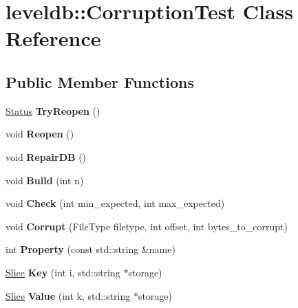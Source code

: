 \hypertarget{classleveldb_1_1_corruption_test}{}\section{leveldb\+::Corruption\+Test Class Reference}
\label{classleveldb_1_1_corruption_test}
\subsection*{Public Member Functions}
\begin{DoxyCompactItemize}
\item 
\mbox{\label{classleveldb_1_1_corruption_test_aaba7c05f06400ef45d1af5cb95f66a57}} 
\mbox{\hyperlink{classleveldb_1_1_status}{Status}} {\bfseries Try\+Reopen} ()
\item 
\mbox{\label{classleveldb_1_1_corruption_test_aa2051faee6b6542d35ebdcf99918a713}} 
void {\bfseries Reopen} ()
\item 
\mbox{\label{classleveldb_1_1_corruption_test_aff36b45496c39a006a14df201ef7d57b}} 
void {\bfseries Repair\+DB} ()
\item 
\mbox{\label{classleveldb_1_1_corruption_test_a54d2114311c61356e879b5ccfc3cda18}} 
void {\bfseries Build} (int n)
\item 
\mbox{\label{classleveldb_1_1_corruption_test_aa03dcde1d0771ebbcf7d6ac8bda9c725}} 
void {\bfseries Check} (int min\+\_\+expected, int max\+\_\+expected)
\item 
\mbox{\label{classleveldb_1_1_corruption_test_a22060ac0a3697640cdcf36973339b646}} 
void {\bfseries Corrupt} (File\+Type filetype, int offset, int bytes\+\_\+to\+\_\+corrupt)
\item 
\mbox{\label{classleveldb_1_1_corruption_test_aab1ed767d1cdac7e95a32ccf6defc709}} 
int {\bfseries Property} (const std\+::string \&name)
\item 
\mbox{\label{classleveldb_1_1_corruption_test_a157c0095fca3c0a2ccaf3b8647705469}} 
\mbox{\hyperlink{classleveldb_1_1_slice}{Slice}} {\bfseries Key} (int i, std\+::string $\ast$storage)
\item 
\mbox{\label{classleveldb_1_1_corruption_test_a0afb6030faf43287b86e027a13eac152}} 
\mbox{\hyperlink{classleveldb_1_1_slice}{Slice}} {\bfseries Value} (int k, std\+::string $\ast$storage)
\end{DoxyCompactItemize}
